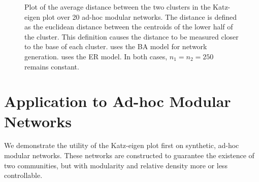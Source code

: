 \documentclass{IEEEtran}
\begin{document}
	\begin{figure}
		\centering
		\caption{Plot of the average distance between the two clusters in the Katz-eigen plot over 20 ad-hoc modular networks. The distance is defined as the euclidean distance between the centroids of the lower half of the cluster. This definition causes the distance to be measured closer to the base of each cluster.  uses the BA model for network generation.  uses the ER model. In both cases, $n_1=n_2=250$ remains constant.}
		\label{fig:dist}
	\end{figure}
	
	\section{Application to Ad-hoc Modular Networks}
	\label{s:randomGraphs}
	We demonstrate the utility of the Katz-eigen plot first on synthetic, ad-hoc modular networks. These networks are constructed to guarantee the existence of two communities, but with modularity and relative density more or less controllable. 
	
\end{document}
